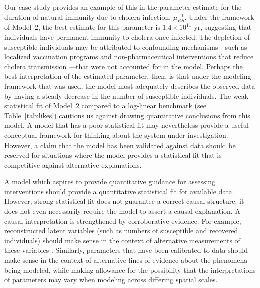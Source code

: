 \documentclass[10pt,letterpaper]{article}\usepackage[]{graphicx}\usepackage[table]{xcolor}
\newcommand\muRS{\mu_{RS}}
\begin{document}
Our case study provides an example of this in the parameter estimate for the duration of natural immunity due to cholera infection, $\muRS^{-1}$.
Under the framework of Model~2, the best estimate for this parameter is $\ensuremath{1.4\times 10^{11}}$ yr, suggesting that individuals have  permanent immunity to cholera once infected.
The depletion of susceptible individuals may  be attributed to confounding mechanisms---such as localized vaccination programs and non-pharmaceutical interventions that reduce cholera transmission \cite{trevisin22, rebaudet21}---that were not accounted for in the model.
Perhaps the best interpretation of the estimated parameter, then, is that under the modeling framework that was used, the model most adequately describes the observed data by having a steady decrease in the number of susceptible individuals.
The weak statistical fit of Model~2 compared to a log-linear benchmark (see Table~\ref{tab:likes}) cautions us against drawing quantitative conclusions from this model.
A model that has a poor statistical fit may nevertheless provide a useful conceptual framework for thinking about the system under investigation.
However, a claim that the model has been validated against data should be reserved for situations where the model provides a statistical fit that is competitive against alternative explanations.

A model which aspires to provide quantitative guidance for assessing interventions should provide a quantitative statistical fit for available data.
However, strong statistical fit does not guarantee a correct causal structure: it does not even necessarily require the model to assert a causal explanation.
A causal interpretation is strengthened by corroborative evidence.
For example, reconstructed latent variables (such as numbers of susceptible and recovered individuals) should make sense in the context of alternative measurements of these variables \cite{grad12}.
Similarly, parameters that have been calibrated to data should make sense in the context of alternative lines of evidence about the phenomena being modeled, while making allowance for the possibility that the interpretations of parameters may vary when modeling across differing spatial scales.
\end{document}
